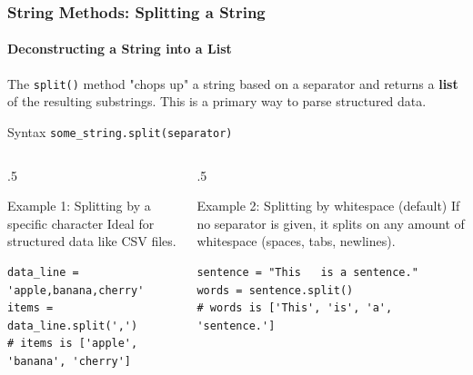 \documentclass{beamer}
\begin{document}
\begin{frame}[fragile]
    \frametitle{String Methods: Splitting a String}
    \framesubtitle{Deconstructing a String into a List}

    The \texttt{split()} method "chops up" a string based on a separator and returns a \textbf{list} of the resulting substrings. This is a primary way to parse structured data.

    \vspace{1em}

    \begin{block}{Syntax}
        \texttt{some\_string.split(separator)}
    \end{block}

    \begin{columns}[T]
        \begin{column}{.5\textwidth}
            \begin{block}{Example 1: Splitting by a specific character}
                Ideal for structured data like CSV files.
                \begin{verbatim}
data_line = 'apple,banana,cherry'
items = data_line.split(',')
# items is ['apple', 'banana', 'cherry']
                \end{verbatim}
            \end{block}
        \end{column}
        \begin{column}{.5\textwidth}
            \begin{block}{Example 2: Splitting by whitespace (default)}
                If no separator is given, it splits on any amount of whitespace (spaces, tabs, newlines).
                \begin{verbatim}
sentence = "This   is a sentence."
words = sentence.split()
# words is ['This', 'is', 'a', 'sentence.']
                \end{verbatim}
            \end{block}
        \end{column}
    \end{columns}
\end{frame}
\end{document}
